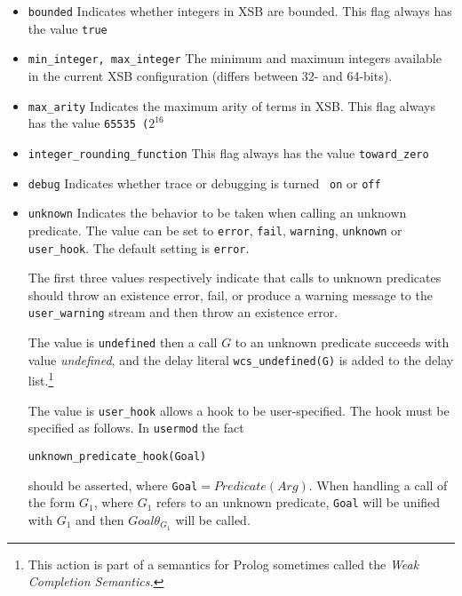 \begin{description}
\begin{itemize}
\item {\tt bounded} Indicates whether integers in XSB are bounded.
  This flag always has the value {\tt true}
%
\item {\tt min\_integer, max\_integer} The minimum and maximum
  integers available in the current XSB configuration (differs between
  32- and 64-bits).
%
\item {\tt max\_arity} Indicates the maximum arity of terms in XSB.
  This flag always has the value {\tt 65535 ($2^{16}$}
%
\item {\tt integer\_rounding\_function} This flag always has the value
  {\tt toward\_zero}
%
\item {\tt debug} Indicates whether trace or debugging is turned {\tt
  on} or {\tt off}
%
\item {\tt unknown} Indicates the behavior to be taken when calling an
  unknown predicate.  The value can be set to {\tt error}, {\tt fail},
  {\tt warning}, {\tt unknown} or {\tt user\_hook}.  The default
  setting is {\tt error}.
  
  The first three values respectively indicate that calls to unknown
  predicates should throw an existence error, fail, or produce a
  warning message to the {\tt user\_warning} stream and then throw an
  existence error.
  
  The value is {\tt undefined} then a call $G$ to an unknown
  predicate succeeds with value {\em undefined}, and the delay literal
  {\tt wcs\_undefined(G)} is added to the delay list.\footnote{This
    action is part of a semantics for Prolog sometimes called the {\em
      Weak Completion Semantics.}}

  The value is {\tt user\_hook} allows a hook to be user-specified.
  The hook must be specified as follows.  In {\tt usermod} the fact
  
  {\tt unknown\_predicate\_hook(Goal)} 

  should be asserted, where {\tt Goal}$= Predicate(Arg)$.  When
  handling a call of the form $G_1$, where $G_1$ refers to an unknown
  predicate, {\tt Goal} will be unified with $G_1$ and then
  $Goal\theta_{G_1}$ will be called.


\end{itemize}
\end{description}
